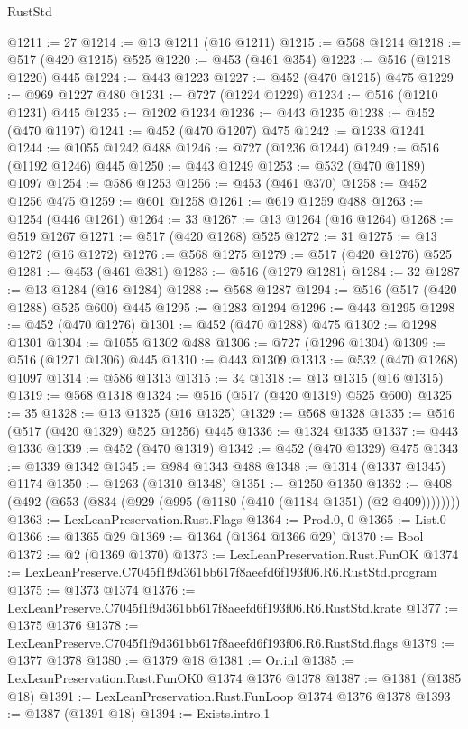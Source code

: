 \begin{lexlean}{RustStd}
\begin{coremodule}
@1211 := 27
@1214 := @13 @1211 (@16 @1211)
@1215 := @568 @1214
@1218 := @517 (@420 @1215) @525
@1220 := @453 (@461 @354)
@1223 := @516 (@1218 @1220) @445
@1224 := @443 @1223
@1227 := @452 (@470 @1215) @475
@1229 := @969 @1227 @480
@1231 := @727 (@1224 @1229)
@1234 := @516 (@1210 @1231) @445
@1235 := @1202 @1234
@1236 := @443 @1235
@1238 := @452 (@470 @1197)
@1241 := @452 (@470 @1207) @475
@1242 := @1238 @1241
@1244 := @1055 @1242 @488
@1246 := @727 (@1236 @1244)
@1249 := @516 (@1192 @1246) @445
@1250 := @443 @1249
@1253 := @532 (@470 @1189) @1097
@1254 := @586 @1253
@1256 := @453 (@461 @370)
@1258 := @452 @1256 @475
@1259 := @601 @1258
@1261 := @619 @1259 @488
@1263 := @1254 (@446 @1261)
@1264 := 33
@1267 := @13 @1264 (@16 @1264)
@1268 := @519 @1267
@1271 := @517 (@420 @1268) @525
@1272 := 31
@1275 := @13 @1272 (@16 @1272)
@1276 := @568 @1275
@1279 := @517 (@420 @1276) @525
@1281 := @453 (@461 @381)
@1283 := @516 (@1279 @1281)
@1284 := 32
@1287 := @13 @1284 (@16 @1284)
@1288 := @568 @1287
@1294 := @516 (@517 (@420 @1288) @525 @600) @445
@1295 := @1283 @1294
@1296 := @443 @1295
@1298 := @452 (@470 @1276)
@1301 := @452 (@470 @1288) @475
@1302 := @1298 @1301
@1304 := @1055 @1302 @488
@1306 := @727 (@1296 @1304)
@1309 := @516 (@1271 @1306) @445
@1310 := @443 @1309
@1313 := @532 (@470 @1268) @1097
@1314 := @586 @1313
@1315 := 34
@1318 := @13 @1315 (@16 @1315)
@1319 := @568 @1318
@1324 := @516 (@517 (@420 @1319) @525 @600)
@1325 := 35
@1328 := @13 @1325 (@16 @1325)
@1329 := @568 @1328
@1335 := @516 (@517 (@420 @1329) @525 @1256) @445
@1336 := @1324 @1335
@1337 := @443 @1336
@1339 := @452 (@470 @1319)
@1342 := @452 (@470 @1329) @475
@1343 := @1339 @1342
@1345 := @984 @1343 @488
@1348 := @1314 (@1337 @1345) @1174
@1350 := @1263 (@1310 @1348)
@1351 := @1250 @1350
@1362 := @408 (@492 (@653 (@834 (@929 (@995 (@1180 (@410 (@1184 @1351) (@2 @409))))))))
@1363 := LexLeanPreservation.Rust.Flags
@1364 := Prod.{0, 0}
@1365 := List.{0}
@1366 := @1365 @29
@1369 := @1364 (@1364 @1366 @29)
@1370 := Bool
@1372 := @2 (@1369 @1370)
@1373 := LexLeanPreservation.Rust.FunOK
@1374 := LexLeanPreserve.C7045f1f9d361bb617f8aeefd6f193f06.R6.RustStd.program
@1375 := @1373 @1374
@1376 := LexLeanPreserve.C7045f1f9d361bb617f8aeefd6f193f06.R6.RustStd.krate
@1377 := @1375 @1376
@1378 := LexLeanPreserve.C7045f1f9d361bb617f8aeefd6f193f06.R6.RustStd.flags
@1379 := @1377 @1378
@1380 := @1379 @18
@1381 := Or.inl
@1385 := LexLeanPreservation.Rust.FunOK0 @1374 @1376 @1378
@1387 := @1381 (@1385 @18)
@1391 := LexLeanPreservation.Rust.FunLoop @1374 @1376 @1378
@1393 := @1387 (@1391 @18)
@1394 := Exists.intro.{1}

\end{coremodule}
\end{lexlean}
